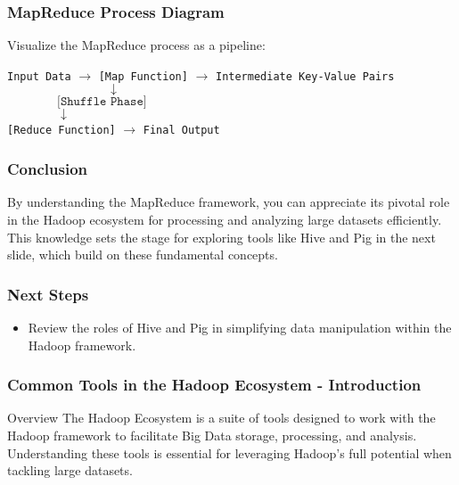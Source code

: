 \documentclass[aspectratio=169]{beamer}
\begin{document}
\begin{frame}
    \frametitle{MapReduce Process Diagram}
    Visualize the MapReduce process as a pipeline:
    \begin{center}
        \texttt{Input Data} $\rightarrow$ \texttt{[Map Function]} $\rightarrow$ \texttt{Intermediate Key-Value Pairs} \\
        $\quad \quad \quad \quad \quad \quad \quad \quad \downarrow$ \\
        $\quad \quad \quad \quad \texttt{[Shuffle Phase]}$ \\
        $\quad \quad \quad \quad \downarrow$ \\
        \texttt{[Reduce Function]} $\rightarrow$ \texttt{Final Output}
    \end{center}
\end{frame}

\begin{frame}
    \frametitle{Conclusion}
    By understanding the MapReduce framework, you can appreciate its pivotal role in the Hadoop ecosystem for processing and analyzing large datasets efficiently. This knowledge sets the stage for exploring tools like Hive and Pig in the next slide, which build on these fundamental concepts.
\end{frame}

\begin{frame}
    \frametitle{Next Steps}
    \begin{itemize}
        \item Review the roles of Hive and Pig in simplifying data manipulation within the Hadoop framework.
    \end{itemize}
\end{frame}

\begin{frame}[fragile]
    \frametitle{Common Tools in the Hadoop Ecosystem - Introduction}
    \begin{block}{Overview}
        The Hadoop Ecosystem is a suite of tools designed to work with the Hadoop framework to facilitate Big Data storage, processing, and analysis. Understanding these tools is essential for leveraging Hadoop's full potential when tackling large datasets.
    \end{block}
\end{frame}
\end{document}
